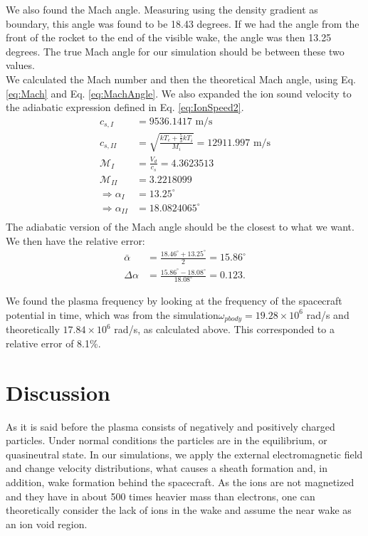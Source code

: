 \documentclass[aip, 
rsi, 
amsmath,
amssymb,
longbibliography,
preprint]{revtex4-1}
\begin{document}
We also found the Mach angle. Measuring using the density gradient as boundary, this angle was found to be 18.43 degrees. If we had the angle from the front of the rocket to the end of the visible wake, the angle was then 13.25 degrees. The true Mach angle for our simulation should be between these two values.\\

We calculated the Mach number and then the theoretical Mach angle, using Eq. \ref{eq:Mach} and Eq. \ref{eq:MachAngle}. We also expanded the ion sound velocity to the adiabatic expression defined in Eq. \ref{eq:IonSpeed2}.
\begin{align*}
c_{s,I} &= 9536.1417 \, \, \text{m/s}\\
c_{s,II} &= \sqrt{\frac{kT_e + \frac{5}{3} k T_i}{ M_i}} = 12911.997 \, \, \text{m/s}\\
\mathcal{M}_{I} &= \frac{V_d}{c_s} = 4.3623513\\
\mathcal{M}_{II} &= 3.2218099\\
\Rightarrow \alpha_{I} &= 13.25 ^{\circ}\\
\Rightarrow \alpha_{II} &= 18.0824065 ^{\circ}\\
\end{align*}
The adiabatic version of the Mach angle should be the closest to what we want. We then have the relative error:
\begin{align*}
\bar{\alpha} &= \frac{18.46^{\circ} + 13.25^{\circ}}{2} = 15.86^{\circ}\\
\Delta \alpha &= \frac{15.86 ^{\circ}- 18.08^{\circ}}{18.08^{\circ}} = 0.123.
\end{align*}

We found the plasma frequency by looking at the frequency of the spacecraft potential in time, which was from the simulation$\omega_{pbody} = 19.28\times10^{6}$ rad/s and theoretically $17.84\times 10^{6}$ rad/s, as calculated above. This corresponded to a relative error of 8.1\%.

\section{Discussion}

As it is said before the plasma consists of negatively and positively charged particles. Under normal conditions the particles are in the equilibrium, or quasineutral state. In our simulations, we apply the external electromagnetic field and change velocity distributions, what causes a sheath formation and, in addition, wake formation behind the spacecraft. As the ions are not magnetized and they have in about 500 times heavier mass than electrons, one can theoretically consider the lack of ions in the wake and assume the near wake as an ion void region.\\
\end{document}
